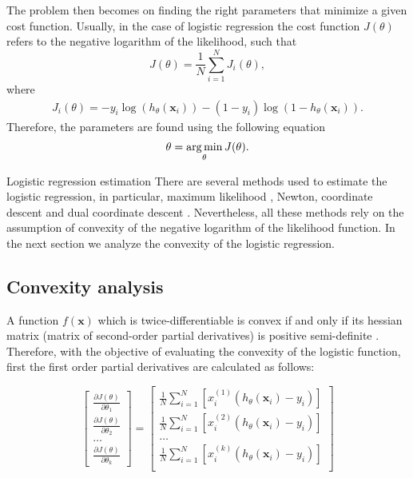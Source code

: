 The problem then becomes on finding the right parameters that minimize a given cost function.   
Usually, in the case of logistic regression the cost function $J(\theta)$ refers to the negative   
logarithm of the likelihood, such that
\begin{equation}
  J(\theta)=\frac{1}{N}\sum_{i=1}^{N} J_i(\theta),
\end{equation}
where
\begin{align}\label{eq:7:lrcost}
  J_i(\theta) =  -y_i\log(h_\theta(\mathbf{x}_i)) -(1-y_i)\log(1-h_\theta(\mathbf{x}_i)).
\end{align}
Therefore, the parameters are found using the following equation
\begin{align}
  \theta = \operatorname*{arg\,min}_\theta J(\theta).
\end{align}

\begin{remark}{Logistic regression estimation}
There are several methods used to estimate the logistic regression, in particular, maximum 
likelihood \citep{Hastie2009}, Newton, coordinate descent \citep{Murphy2012} and dual coordinate 
descent \citep{Yu2011}. Nevertheless, all these methods rely on the assumption of convexity of the
negative logarithm of the likelihood function. In the next section we analyze the convexity of the 
logistic regression.
\end{remark}

\subsection{Convexity analysis}

A function $f(\mathbf{x})$ which is twice-differentiable is convex if and only if its hessian 
matrix (matrix of second-order partial derivatives) is positive semi-definite \citep{Boyd2010}.
Therefore, with the objective of evaluating the convexity of the logistic function, first the first 
order partial derivatives are calculated as follows:

\begin{equation}
\left[ \begin{array}{c}
  \frac{\partial J(\theta)}{\partial \theta_1} \\[0.1in]	
  \frac{\partial J(\theta)}{\partial \theta_2} \\[0.1in]	
  \ldots \\[0.1in]	
  \frac{\partial J(\theta)}{\partial \theta_k}
\end{array} \right] =
\left[ \begin{array}{c}
  \frac{1}{N}\sum_{i=1}^{N}\left[x_i^{(1)}\left(h_\theta(\mathbf{x}_i)-y_i\right)\right]\\[0.1in]
  \frac{1}{N}\sum_{i=1}^{N}\left[x_i^{(2)}\left(h_\theta(\mathbf{x}_i)-y_i\right)\right]\\[0.1in]
  \ldots \\[0.1in]	
  \frac{1}{N}\sum_{i=1}^{N}\left[x_i^{(k)}\left(h_\theta(\mathbf{x}_i)-y_i\right)\right]\\[0.1in]	
\end{array} \right]
\end{equation}


